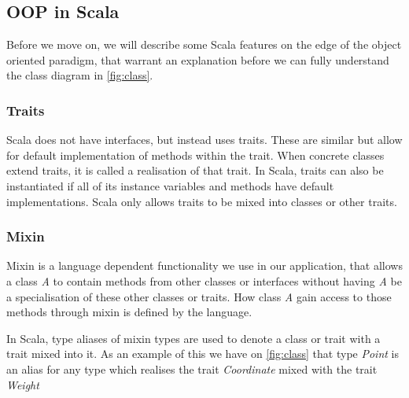 \subsection{OOP in Scala}
Before we move on, we will describe some Scala features on the edge of the object oriented paradigm, that warrant an explanation before we can fully understand the class diagram in \cref{fig:class}.

\subsubsection{Traits}
Scala does not have interfaces, but instead uses traits. These are similar but allow for default implementation of methods within the trait. When concrete classes extend traits, it is called a realisation of that trait. In Scala, traits can also be instantiated if all of its instance variables and methods have default implementations. Scala only allows traits to be mixed into classes or other traits.

\subsubsection{Mixin}
Mixin is a language dependent functionality we use in our application, that allows a class \emph{A} to contain methods from other classes or interfaces without having \emph{A} be a specialisation of these other classes or traits. How class \emph{A} gain access to those methods through mixin is defined by the language. 

In Scala, type aliases of mixin types are used to denote a class or trait with a trait mixed into it. As an example of this we have on \cref{fig:class} that type \emph{Point} is an alias for any type which realises the trait \emph{Coordinate} mixed with the trait \emph{Weight}
